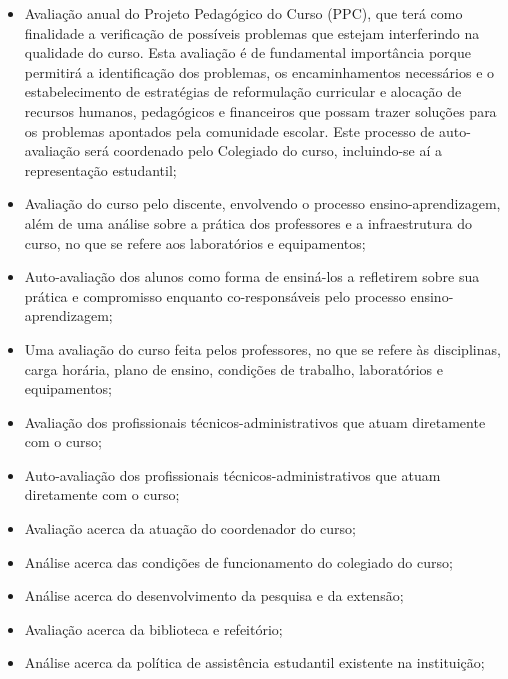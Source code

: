 \begin{itemize}
	\item Avaliação anual do Projeto Pedagógico do Curso (PPC), que terá como finalidade a verificação de possíveis problemas que estejam interferindo na qualidade do curso. Esta avaliação é de fundamental importância porque permitirá a identificação dos problemas, os encaminhamentos necessários e o estabelecimento de estratégias de reformulação curricular e alocação de recursos humanos, pedagógicos e financeiros que possam trazer soluções para os problemas apontados pela comunidade escolar. Este processo de auto-avaliação será coordenado pelo Colegiado do curso, incluindo-se aí a representação estudantil;

	\item Avaliação do curso pelo discente, envolvendo o processo ensino-aprendizagem, além de uma análise sobre a prática dos professores e a infraestrutura do curso, no que se refere aos laboratórios e equipamentos;

	\item Auto-avaliação dos alunos como forma de ensiná-los a refletirem sobre sua prática e compromisso enquanto co-responsáveis pelo processo ensino-aprendizagem;

	\item Uma avaliação do curso feita pelos professores, no que se refere às disciplinas, carga horária, plano de ensino, condições de trabalho, laboratórios e equipamentos;

	\item Avaliação dos profissionais técnicos-administrativos que atuam diretamente com o curso;

	\item Auto-avaliação dos profissionais técnicos-administrativos que atuam diretamente com o curso;

	\item Avaliação acerca da atuação do coordenador do curso;

	\item Análise acerca das condições de funcionamento do colegiado do curso;

	\item Análise acerca do desenvolvimento da pesquisa e da extensão;

	\item Avaliação acerca da biblioteca e refeitório;

	\item Análise acerca da política de assistência estudantil existente na instituição;
\end{itemize}

